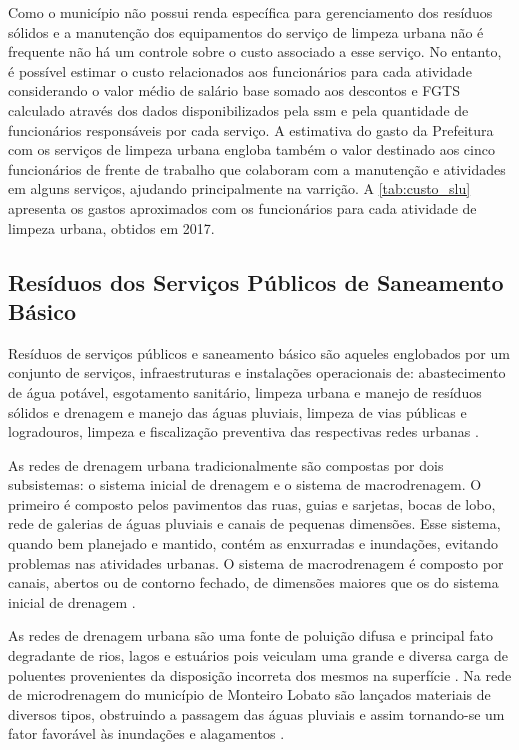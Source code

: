 	Como o município não possui renda específica para gerenciamento dos resíduos sólidos e a manutenção dos equipamentos do serviço de limpeza urbana não é frequente não há um controle sobre o custo associado a esse serviço. No entanto, é possível estimar o custo relacionados aos funcionários para cada atividade considerando o valor médio de salário base somado aos descontos e FGTS calculado através dos dados disponibilizados pela \gls{ssm} e pela quantidade de funcionários responsáveis por cada serviço. A estimativa do gasto da Prefeitura com os serviços de limpeza urbana engloba também o valor destinado aos cinco funcionários de frente de trabalho que colaboram com a manutenção e atividades em alguns serviços, ajudando principalmente na varrição.  A \autoref{tab:custo_slu} apresenta os gastos aproximados com os funcionários para cada atividade de limpeza urbana, obtidos em 2017.
	
	
	
	\subsection{Resíduos dos Serviços Públicos de Saneamento Básico}
	
	Resíduos de serviços públicos e saneamento básico são aqueles englobados por um conjunto de serviços, infraestruturas e instalações operacionais de: abastecimento de água potável, esgotamento sanitário, limpeza urbana e manejo de resíduos sólidos e drenagem e manejo das águas pluviais, limpeza de vias públicas e logradouros, limpeza e fiscalização preventiva das respectivas redes urbanas \cite{brasil:12305}.  
	
	As redes de drenagem urbana tradicionalmente são compostas por dois subsistemas: o sistema inicial de drenagem e o sistema de macrodrenagem. O primeiro é composto pelos pavimentos das ruas, guias e sarjetas, bocas de lobo, rede de galerias de águas pluviais e canais de pequenas dimensões. Esse sistema, quando bem planejado e mantido, contém as enxurradas e inundações, evitando problemas nas atividades urbanas. O sistema de macrodrenagem é composto por canais, abertos ou de contorno fechado, de dimensões maiores que os do sistema inicial de drenagem \cite{Ramos:1999}.
	
	As redes de drenagem urbana são uma fonte de poluição difusa e principal fato degradante de rios, lagos e estuários pois veiculam uma grande e diversa carga de poluentes provenientes da disposição incorreta dos mesmos na superfície \cite{Brites2004}. Na rede de microdrenagem do município de Monteiro Lobato são lançados materiais de diversos tipos, obstruindo a passagem das águas pluviais e assim tornando-se um fator favorável às inundações e alagamentos \cite{MonteiroLobato}.
 	
